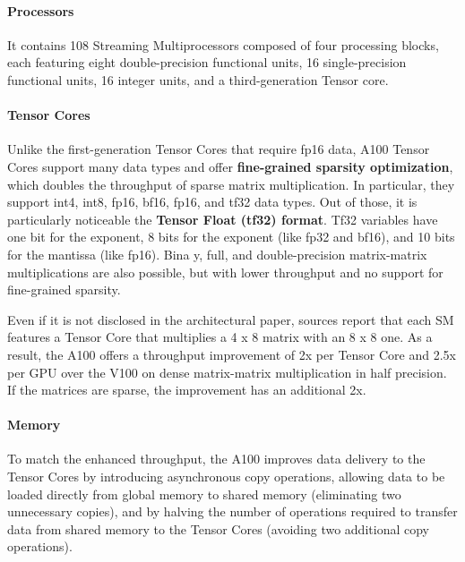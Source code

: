 \documentclass[conference]{IEEEtran}
\begin{document}
\paragraph{Processors}
It contains 108 Streaming Multiprocessors composed of four processing blocks, each featuring eight double-precision functional units, 16 single-precision functional units, 16 integer units, and a third-generation Tensor core.
\paragraph{Tensor Cores}
Unlike the first-generation Tensor Cores that require fp16 data, A100 Tensor Cores support many data types and offer \textbf{fine-grained sparsity optimization}, which doubles the throughput of sparse matrix multiplication. In particular, they support int4, int8, fp16, bf16, fp16, and tf32 data types. Out of those, it is particularly noticeable the \textbf{Tensor Float (tf32) format}. Tf32 variables have one bit for the exponent, 8 bits for the exponent (like fp32 and bf16), and 10 bits for the mantissa (like fp16). Bina y, full, and double-precision matrix-matrix multiplications are also possible, but with lower throughput and no support for fine-grained sparsity.


Even if it is not disclosed in the architectural paper, sources report that each SM features a Tensor Core that multiplies a 4 x 8 matrix with an 8 x 8 one.
As a result, the A100 offers a throughput improvement of 2x per Tensor Core and 2.5x per GPU over the V100 on dense matrix-matrix multiplication in half precision. If the matrices are sparse, the improvement has an additional 2x.
\paragraph{Memory}
To match the enhanced throughput, the A100 improves data delivery to the Tensor Cores by introducing asynchronous copy operations, allowing data to be loaded directly from global memory to shared memory (eliminating two unnecessary copies), and by halving the number of operations required to transfer data from shared memory to the Tensor Cores (avoiding two additional copy operations).
\end{document}
